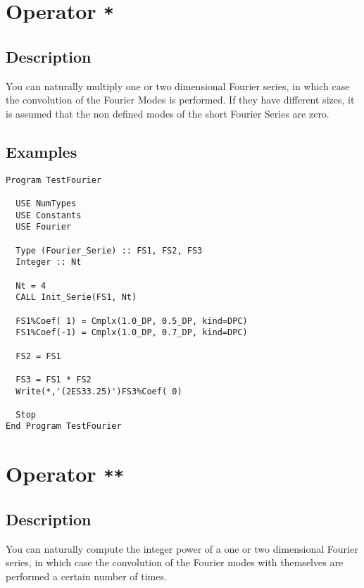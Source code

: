 \section{Operator \texttt{*}}

\subsection{Description}

You can naturally multiply one or two dimensional Fourier series, in 
which case the convolution of the Fourier Modes is performed. If they
have different sizes, it is assumed that the non defined modes of the
short Fourier Series are zero.

\subsection{Examples}

\begin{lstlisting}[emph=Type,
                   emphstyle=\color{blue},
                   frame=trBL,
                   caption=Computing the convolution of Fourier series.,
                   label=prodf]
Program TestFourier

  USE NumTypes
  USE Constants
  USE Fourier

  Type (Fourier_Serie) :: FS1, FS2, FS3
  Integer :: Nt

  Nt = 4
  CALL Init_Serie(FS1, Nt)

  FS1%Coef( 1) = Cmplx(1.0_DP, 0.5_DP, kind=DPC)
  FS1%Coef(-1) = Cmplx(1.0_DP, 0.7_DP, kind=DPC)
  
  FS2 = FS1  

  FS3 = FS1 * FS2
  Write(*,'(2ES33.25)')FS3%Coef( 0)

  Stop
End Program TestFourier
\end{lstlisting}

\section{Operator \texttt{**}}

\subsection{Description}

You can naturally compute the integer power of a one or two
dimensional Fourier series, in which case the convolution of the
Fourier modes with themselves are performed a certain number of
times. 

